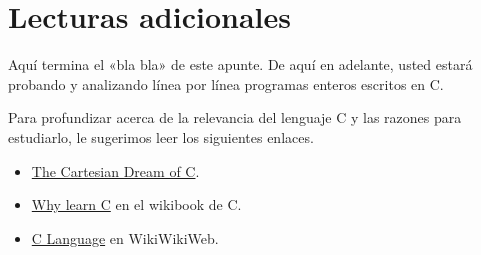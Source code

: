\section{Lecturas adicionales}

Aquí termina el «bla bla» de este apunte. De aquí en adelante, usted
estará probando y analizando línea por línea programas enteros escritos
en C.

Para profundizar acerca de la relevancia del lenguaje C y las razones
para estudiarlo, le sugerimos leer los siguientes enlaces.

\begin{itemize}
\item
  \href{http://c.learncodethehardway.org/book/learn-c-the-hard-wayli3.html}{The
  Cartesian Dream of C}.
\item
  \href{http://en.wikibooks.org/wiki/C\_Programming/Why\_learn\_C\%3F}{Why
  learn C} en el wikibook de C.
\item
  \href{http://c2.com/cgi/wiki?CeeLanguage}{C Language} en WikiWikiWeb.
\end{itemize}
